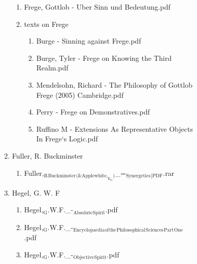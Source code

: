 \documentclass[11pt]{article}
\begin{document}
\begin{enumerate}
\begin{enumerate}
\begin{enumerate}
\begin{enumerate}
\begin{enumerate}
\begin{enumerate}
\begin{enumerate}
\item Frege, Gottlob - Uber Sinn und Bedeutung.pdf
\label{sec-1-1-1-1-7-3-39-13-34-3}

\item texts on Frege
\label{sec-1-1-1-1-7-3-39-13-34-4}
\begin{enumerate}
\item Burge - Sinning against Frege.pdf
\label{sec-1-1-1-1-7-3-39-13-34-4-1}

\item Burge, Tyler - Frege on Knowing the Third Realm.pdf
\label{sec-1-1-1-1-7-3-39-13-34-4-2}

\item Mendelsohn, Richard - The Philosophy of Gottlob Frege (2005) Cambridge.pdf
\label{sec-1-1-1-1-7-3-39-13-34-4-3}

\item Perry - Frege on Demonstratives.pdf
\label{sec-1-1-1-1-7-3-39-13-34-4-4}

\item Ruffino M - Extensions As Representative Objects In Frege‘s Logic.pdf
\label{sec-1-1-1-1-7-3-39-13-34-4-5}
\end{enumerate}
\end{enumerate}

\item Fuller, R. Buckminster
\label{sec-1-1-1-1-7-3-39-13-35}
\begin{enumerate}
\item Fuller,$_{\text{R}}$$_{\text{Buckminster}}$$_{\text{(\& Applewhite,}_{\text{E}}_{\text{G}}\text{)}}$\_=$_{\text{Synergetics}}$$_{\text{[PDF}}$.rar
\label{sec-1-1-1-1-7-3-39-13-35-1}
\end{enumerate}

\item Hegel, G. W. F
\label{sec-1-1-1-1-7-3-39-13-36}
\begin{enumerate}
\item Hegel,$_{\text{G}}$.W.F.\_-$_{\text{Absolute}}$$_{\text{Spirit}}$.pdf
\label{sec-1-1-1-1-7-3-39-13-36-1}

\item Hegel,$_{\text{G}}$.W.F.\_-$_{\text{Encyclopaedia}}$$_{\text{of}}$$_{\text{the}}$$_{\text{Philosophical}}$$_{\text{Sciences}}$$_{\text{Part}}$$_{\text{One}}$.pdf
\label{sec-1-1-1-1-7-3-39-13-36-2}

\item Hegel,$_{\text{G}}$.W.F.\_-$_{\text{Objective}}$$_{\text{Spirit}}$.pdf
\label{sec-1-1-1-1-7-3-39-13-36-3}


\end{enumerate}
\end{enumerate}
\end{enumerate}
\end{enumerate}
\end{enumerate}
\end{enumerate}
\end{enumerate}
\end{document}
